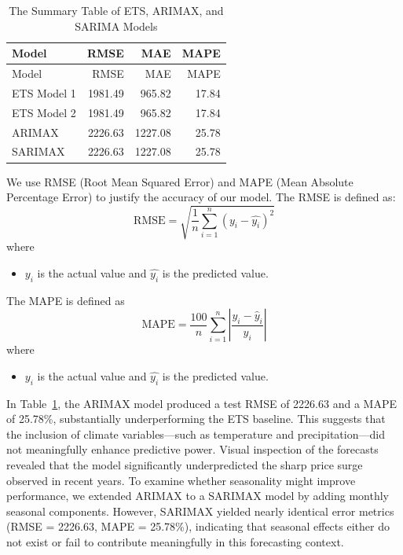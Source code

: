 \documentclass[
  letterpaper,
  DIV=11,
  numbers=noendperiod]{scrartcl}
\providecommand{\tightlist}{%
  \setlength{\itemsep}{0pt}\setlength{\parskip}{0pt}}\usepackage{longtable,booktabs,array}
\begin{document}
\hypertarget{tbl-est-sum-1}{}
\begin{longtable}[]{@{}lrrr@{}}
\caption{\label{tbl-est-sum-1}The Summary Table of ETS, ARIMAX, and
SARIMA Models}\tabularnewline
\toprule()
Model & RMSE & MAE & MAPE \\
\midrule()
\endfirsthead
\toprule()
Model & RMSE & MAE & MAPE \\
\midrule()
\endhead
ETS Model 1 & 1981.49 & 965.82 & 17.84 \\
ETS Model 2 & 1981.49 & 965.82 & 17.84 \\
ARIMAX & 2226.63 & 1227.08 & 25.78 \\
SARIMAX & 2226.63 & 1227.08 & 25.78 \\
\bottomrule()
\end{longtable}

We use RMSE (Root Mean Squared Error) and MAPE (Mean Absolute Percentage
Error) to justify the accuracy of our model. The RMSE is defined as:
\[\text{RMSE} = \sqrt{\frac{1}{n}\sum^{n}_{i = 1}(y_i-\hat{y_i})^2}\]
where

\begin{itemize}
\tightlist
\item
  \(y_i\) is the actual value and \(\hat{y_i}\) is the predicted value.
\end{itemize}

The MAPE is defined as
\[\text{MAPE} = \frac{100}{n} \sum_{i=1}^{n} \left| \frac{y_i - \hat{y}_i}{y_i} \right|\]
where

\begin{itemize}
\tightlist
\item
  \(y_i\) is the actual value and \(\hat{y_i}\) is the predicted value.
\end{itemize}

In Table~\ref{tbl-est-sum-1}, the ARIMAX model produced a test RMSE of
2226.63 and a MAPE of 25.78\%, substantially underperforming the ETS
baseline. This suggests that the inclusion of climate variables---such
as temperature and precipitation---did not meaningfully enhance
predictive power. Visual inspection of the forecasts revealed that the
model significantly underpredicted the sharp price surge observed in
recent years. To examine whether seasonality might improve performance,
we extended ARIMAX to a SARIMAX model by adding monthly seasonal
components. However, SARIMAX yielded nearly identical error metrics
(RMSE = 2226.63, MAPE = 25.78\%), indicating that seasonal effects
either do not exist or fail to contribute meaningfully in this
forecasting context.
\end{document}
